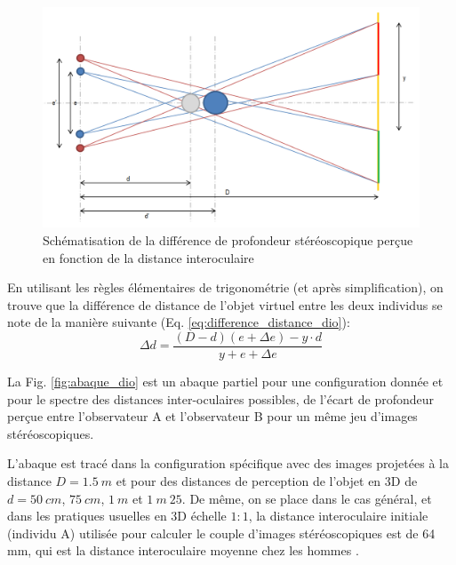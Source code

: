 	\begin{figure}[h]
		\centering
		\includegraphics[scale=.5]{Figures/ProfondeurStereoDIO}
		\caption{Schématisation de la différence de profondeur stéréoscopique perçue en fonction de la distance interoculaire}
		\label{fig:profondeur_stereo_dio}
	\end{figure}

	\par En utilisant les règles élémentaires de trigonométrie (et après simplification), on trouve que la différence de distance de l'objet virtuel entre les deux individus se note de la manière suivante (Eq. \ref{eq:difference_distance_dio}):
	\begin{equation}
		\Delta d = \frac{(D - d)(e + \Delta e) - y \cdot d}{y + e + \Delta e}
		\label{eq:difference_distance_dio} 
	\end{equation}
	
	\par La Fig. \ref{fig:abaque_dio} est un abaque partiel pour une configuration donnée et pour le spectre des distances inter-oculaires possibles, de l'écart de profondeur perçue entre l'observateur A et l'observateur B pour un même jeu d'images stéréoscopiques.
	
	\par L'abaque est tracé dans la configuration spécifique avec des images projetées à la distance $D = 1.5~m$ et pour des distances de perception de l'objet en 3D de $d = 50~cm$, $75~cm$, $1~m$ et $1~m~25$. De même, on se place dans le cas général, et dans les pratiques usuelles en 3D échelle $1:1$, la distance interoculaire initiale (individu A) utilisée pour calculer le couple d'images stéréoscopiques est de 64 mm, qui est la distance interoculaire moyenne chez les hommes \citep{dodgson_variation_2004}.
	
